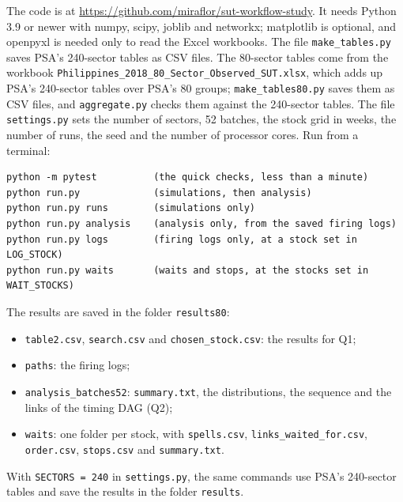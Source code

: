 \documentclass[11pt]{article}
\begin{document}
The code is at \url{https://github.com/miraflor/sut-workflow-study}. It needs Python 3.9 or newer with numpy, scipy, joblib and networkx; matplotlib is optional, and openpyxl is needed only to read the Excel workbooks. The file \texttt{make\_tables.py} saves PSA's 240-sector tables as CSV files. The 80-sector tables come from the workbook \texttt{Philippines\_2018\_80\_Sector\_Observed\_SUT.xlsx}, which adds up PSA's 240-sector tables over PSA's 80 groups; \texttt{make\_tables80.py} saves them as CSV files, and \texttt{aggregate.py} checks them against the 240-sector tables. The file \texttt{settings.py} sets the number of sectors, 52 batches, the stock grid in weeks, the number of runs, the seed and the number of processor cores. Run from a terminal:
\begin{verbatim}
python -m pytest          (the quick checks, less than a minute)
python run.py             (simulations, then analysis)
python run.py runs        (simulations only)
python run.py analysis    (analysis only, from the saved firing logs)
python run.py logs        (firing logs only, at a stock set in LOG_STOCK)
python run.py waits       (waits and stops, at the stocks set in WAIT_STOCKS)
\end{verbatim}
The results are saved in the folder \texttt{results80}:
\begin{itemize}[leftmargin=*]
\item \texttt{table2.csv}, \texttt{search.csv} and \texttt{chosen\_stock.csv}: the results for Q1;
\item \texttt{paths}: the firing logs;
\item \texttt{analysis\_batches52}: \texttt{summary.txt}, the distributions, the sequence and the links of the timing DAG (Q2);
\item \texttt{waits}: one folder per stock, with \texttt{spells.csv}, \texttt{links\_waited\_for.csv}, \texttt{order.csv}, \texttt{stops.csv} and \texttt{summary.txt}.
\end{itemize}
With \texttt{SECTORS = 240} in \texttt{settings.py}, the same commands use PSA's 240-sector tables and save the results in the folder \texttt{results}.
\end{document}
